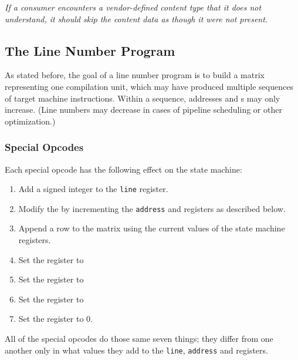 \textit{If a consumer encounters a vendor-defined content type that
it does not understand, it should skip the content data as though
it were not present.}

\subsection{The Line Number Program}
\label{chap:linenumberprogram}
As stated before, the goal of a line number program is to build
a matrix representing one compilation unit, which may have
produced multiple sequences of target machine instructions.
Within a sequence, addresses and 
s may only increase. 
(Line numbers may decrease in cases of pipeline
scheduling or other optimization.)

\subsubsection{Special Opcodes} 
\label{chap:specialopcodes}
Each \HFTubyte{} special opcode has the following effect on the state machine:

\begin{enumerate}[1. ]

\item  Add a signed integer to the \texttt{line} register.

\item  Modify the  by incrementing the
\texttt{address} and  registers as described below.

\item  Append a row to the matrix using the current values
of the state machine registers.

\item  Set the  register to  
\item  Set the  register to 
\item  Set the  register to 
\item  Set the  register to 0.

\end{enumerate}

All of the special opcodes do those same seven things; they
differ from one another only in what values they add to the
\texttt{line}, \texttt{address} and  registers.


